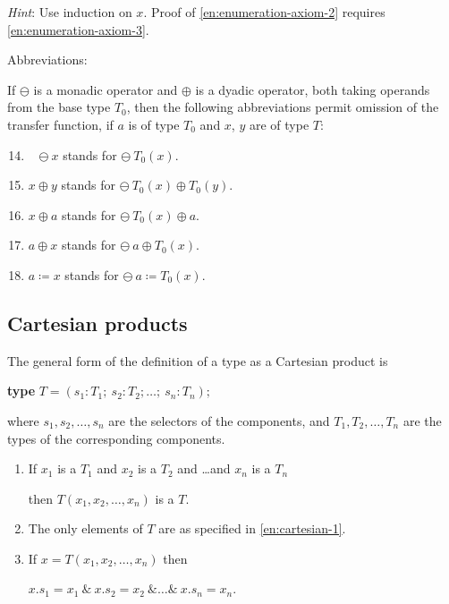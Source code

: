 \noindent
\textit{Hint}: Use induction on $x$. Proof of \ref{en:enumeration-axiom-2} requires \ref{en:enumeration-axiom-3}.

\noindent
Abbreviations:

\noindent
If $\ominus$ is a monadic operator and $\oplus$ is a dyadic operator, both taking operands from the base type $T_0$, then the following abbreviations permit omission of the transfer function, if $a$ is of type $T_0$ and $x$, $y$ are of type $T$:

\begin{enumerate}[wide, nosep, label=(\arabic*)]
	\setcounter{enumi}{13}
	
	\item ~ $\ominus\ x$ stands for $\ominus\ T_0(x)$.

	\item $x \oplus y$ stands for $\ominus\ T_0(x) \oplus T_0(y)$.
	
	\item $x \oplus a$ stands for $\ominus\ T_0(x) \oplus a.$

	\item $a \oplus x$ stands for $\ominus\ a \oplus T_0(x).$

	\item $a \coloneq x$ stands for $\ominus\ a\coloneq T_0(x)$.
\end{enumerate}

\subsection{Cartesian products}

The general form of the definition of a type as a Cartesian product is

\quad \textbf{type} $T = (s_1 : T_1;\ s_2: T_2; \dots ;\ s_n: T_n);$

\noindent
where $s_1, s_2, \dots , s_n$ are the selectors of the components, and $T_1, T_2, \dots, T_n$ are the types of the corresponding components.

\begin{enumerate}[leftmargin=2\parindent, label=(\arabic*)]
	\item \label{en:cartesian-1}
	If $x_1$ is a $T_1$ and $x_2$ is a $T_2$ and \dots and $x_n$ is a $T_n$

	\quad then $T(x_1, x_2, \dots, x_n)$ is a $T$.

	\item The only elements of $T$ are as specified in \ref{en:cartesian-1}.

	\item If $x = T(x_1, x_2, \dots, x_n)$ then

	\quad $x.s_1 = x_1\ \&\ x.s_2 = x_2\ \& \dots \&\ x.s_n = x_n$.

\end{enumerate}

